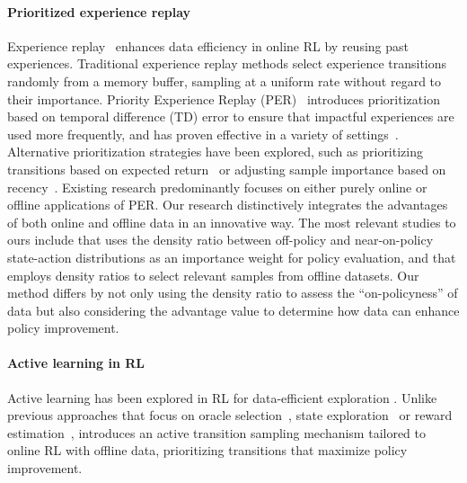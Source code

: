 \paragraph{Prioritized experience replay}
\vspace{-0.3cm}
Experience replay~\citep{lin1992self} enhances data efficiency in online RL by reusing past experiences.
Traditional experience replay methods select experience transitions randomly from a memory buffer, sampling at a uniform rate without regard to their importance. %
Priority Experience Replay (PER)~\citep{schaul2015prioritized} introduces prioritization based on temporal difference (TD) error to ensure that impactful experiences are used more frequently, and has proven effective in a variety of settings~\citep{jaderberg2016reinforcement, wang2016dueling, nair2018overcoming, hessel2018rainbow, oh2021model, saglam2022actor, yue2023offline, tian2023learning}. 
Alternative prioritization strategies have been explored, such as prioritizing transitions based on expected return~\citep{isele2018selective} or adjusting sample importance based on recency~\citep{fedus2020revisiting}. 
Existing research predominantly focuses on either purely online or offline applications of PER. Our research distinctively integrates the advantages of both online and offline data in an innovative way. The most relevant studies to ours include \citet{sinha2022experience} that uses the density ratio between off-policy and near-on-policy state-action distributions as an importance weight for policy evaluation, and \citet{lee2022offline} that employs density ratios to select relevant samples from offline datasets. Our method differs by not only using the density ratio to assess the ``on-policyness'' of data but also considering the advantage value to determine how data can enhance policy improvement.


\paragraph{Active learning in RL}
\vspace{-0.3cm}
Active learning has been explored in RL for data-efficient exploration %
\citep{epshteyn2008active,lopes2009active,  fang2017learning, krueger2020active, liu2022cost,liu2023active,liu2023blending}. %
Unlike previous approaches that focus on %
oracle selection~\citep{liu2023active,liu2023blending}, state exploration~\citep{epshteyn2008active,liu2023active} or reward estimation~\citep{lopes2009active},
\algname introduces an active transition sampling mechanism tailored to online RL with offline data, prioritizing transitions that maximize policy improvement.